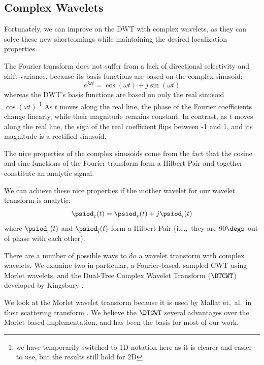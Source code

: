 \subsection{Complex Wavelets}\label{sec:ch2:complex_wavelets}
  Fortunately, we can improve on the DWT with complex wavelets, as they can
  solve these new shortcomings while maintaining the desired localization
  properties. 
  
  The Fourier transform does not suffer from a lack of directional selectivity
  and shift variance, because its basis functions are based on the complex
  sinusoid: 
  \begin{equation} 
    e^{j\omega t} = \cos(\omega t) + j\sin(\omega t)
  \end{equation} 
  whereas the DWT's basis functions are based on only the real
  sinusoid $\cos(\omega t).$\footnote{we have temporarily switched to 1D
  notation here as it is clearer and easier to use, but the results still hold
  for 2D} As $t$ moves along the real line, the phase of the
  Fourier coefficients change linearly, while their magnitude remains constant. In
  contrast, as $t$ moves along the real line, the sign of the real coefficient
  flips between -1 and 1, and its magnitude is a rectified sinusoid.

  The nice properties of the complex sinusoids come from the fact that the
  cosine and sine functions of the Fourier transform form a Hilbert Pair and
  together constitute an analytic signal.

  We can achieve these nice properties if the mother wavelet for our wavelet
  transform is analytic:
  \begin{equation}
    \psiod_{c}(t) = \psiod_{r}(t) + j\psiod_{i}(t) \label{eq:ch2:complex_wavelet}
  \end{equation}
  where $\psiod_{r}(t)$ and $\psiod_{i}(t)$ form a Hilbert Pair (i.e.,\ they are
  $90\degs$ out of phase with each other).

  There are a number of possible ways to do a wavelet transform with complex
  wavelets. We examine two in particular, a Fourier-based, sampled CWT using
  Morlet wavelets, and the Dual-Tree Complex Wavelet Transform ($\DTCWT$)
  developed by Kingsbury \cite{kingsbury_wavelet_1997, kingsbury_dual-tree_1998,
  kingsbury_dual-tree_1998-1,  kingsbury_image_1999, kingsbury_shift_1999,
  kingsbury_dual-tree_2000, kingsbury_complex_2001, selesnick_dual-tree_2005}.

  We look at the Morlet wavelet transform because it is used by
  Mallat et.\ al.\ in their scattering transform
  \cite{bruna_classification_2011, bruna_invariant_2013, bruna_scattering_2013,
  oyallon_generic_2013, oyallon_deep_2015, sifre_rotation_2013,
  sifre_rigid-motion_2014, sifre_rigid-motion_2014-1, sifre_scatnet_2013}. 
  We believe the $\DTCWT$ 
  several advantages over the Morlet based implementation, and has been the
  basis for most of our work.

